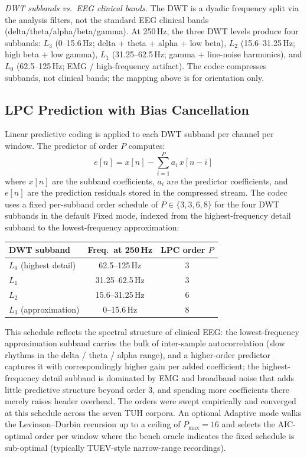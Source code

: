 \documentclass[journal]{IEEEtran}
\begin{document}
\noindent\textit{DWT subbands vs.\ EEG clinical bands.}
The DWT is a dyadic frequency split via the analysis filters,
not the standard EEG clinical bands (delta/theta/alpha/beta/gamma).
At 250\,Hz, the three DWT levels produce four subbands: $L_3$
(0--15.6\,Hz; delta + theta + alpha + low beta), $L_2$
(15.6--31.25\,Hz; high beta + low gamma), $L_1$
(31.25--62.5\,Hz; gamma + line-noise harmonics), and $L_0$
(62.5--125\,Hz; EMG / high-frequency artifact). The codec
compresses subbands, not clinical bands; the mapping above is
for orientation only.

\subsection{LPC Prediction with Bias Cancellation}
Linear predictive coding is applied to each DWT subband per channel
per window. The predictor of order $P$ computes:
%
\begin{equation}
e[n] = x[n] - \sum_{i=1}^{P} a_i \, x[n-i]
\label{eq:lpc}
\end{equation}
%
where $x[n]$ are the subband coefficients, $a_i$ are the predictor
coefficients, and $e[n]$ are the prediction residuals stored in the
compressed stream. The codec uses a fixed per-subband order schedule
of $P \in \{3, 3, 6, 8\}$ for the four DWT subbands in the default
Fixed mode, indexed from the highest-frequency detail subband to
the lowest-frequency approximation:
\begin{center}
\begin{tabular}{lcc}
\toprule
DWT subband & Freq.\ at 250\,Hz & LPC order $P$ \\
\midrule
$L_0$ (highest detail)  & 62.5--125\,Hz   & 3 \\
$L_1$                   & 31.25--62.5\,Hz & 3 \\
$L_2$                   & 15.6--31.25\,Hz & 6 \\
$L_3$ (approximation)   & 0--15.6\,Hz     & 8 \\
\bottomrule
\end{tabular}
\end{center}
This schedule reflects the spectral structure of clinical EEG:
the lowest-frequency approximation subband carries the bulk of
inter-sample autocorrelation (slow rhythms in the delta / theta /
alpha range), and a higher-order predictor captures it with
correspondingly higher gain per added coefficient; the
highest-frequency detail subband is dominated by EMG and broadband
noise that adds little predictive structure beyond order 3, and
spending more coefficients there merely raises header overhead.
The orders were swept empirically and converged at this
schedule across the seven TUH corpora. An optional Adaptive mode
walks the Levinson--Durbin recursion up to a ceiling
of $P_{\max}=16$ and selects the AIC-optimal order per window
where the bench oracle indicates the fixed schedule is
sub-optimal (typically TUEV-style narrow-range recordings).
\end{document}
